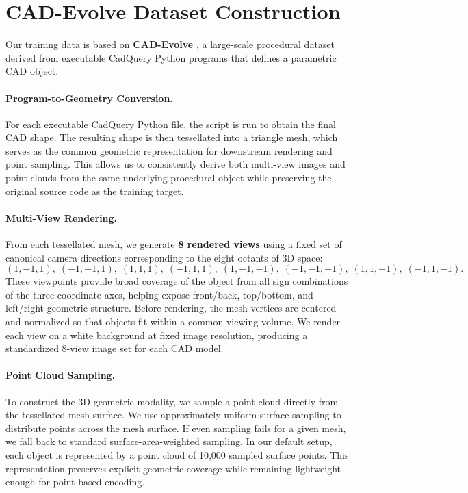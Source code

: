 \documentclass{article}
\begin{document}
\section{CAD-Evolve Dataset Construction}
Our training data is based on \textbf{CAD-Evolve} \cite{elistratov2026cadevolve}, a large-scale procedural dataset derived from executable CadQuery Python programs that defines a parametric CAD object. 

\paragraph{Program-to-Geometry Conversion.}
For each executable CadQuery Python file, the script is run to obtain the final CAD shape. The resulting shape is then tessellated into a triangle mesh, which serves as the common geometric representation for downstream rendering and point sampling. This allows us to consistently derive both multi-view images and point clouds from the same underlying procedural object while preserving the original source code as the training target.

\paragraph{Multi-View Rendering.}
From each tessellated mesh, we generate \textbf{8 rendered views} using a fixed set of canonical camera directions corresponding to the eight octants of 3D space:
\[
(1,-1,1),\; (-1,-1,1),\; (1,1,1),\; (-1,1,1),\;
(1,-1,-1),\; (-1,-1,-1),\; (1,1,-1),\; (-1,1,-1).
\]
These viewpoints provide broad coverage of the object from all sign combinations of the three coordinate axes, helping expose front/back, top/bottom, and left/right geometric structure. Before rendering, the mesh vertices are centered and normalized so that objects fit within a common viewing volume. We render each view on a white background at fixed image resolution, producing a standardized 8-view image set for each CAD model.

\paragraph{Point Cloud Sampling.}
To construct the 3D geometric modality, we sample a point cloud directly from the tessellated mesh surface. We use approximately uniform surface sampling to distribute points across the mesh surface. If even sampling fails for a given mesh, we fall back to standard surface-area-weighted sampling. In our default setup, each object is represented by a point cloud of 10,000 sampled surface points. This representation preserves explicit geometric coverage while remaining lightweight enough for point-based encoding.
\end{document}
